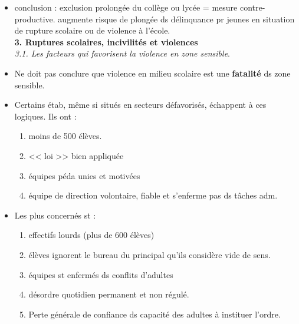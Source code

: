\documentclass[12pt]{report}
\begin{document}
\begin{itemize}
\vspace{0.5cm}

 \item conclusion : exclusion prolongée du collège ou lycée = mesure contre-productive. augmente risque de plongée ds délinquance pr jeunes en situation de rupture scolaire ou de violence à l'école.\\


\textbf{3. Ruptures scolaires, incivilités et violences} \\
\textit{3.1. Les facteurs qui favorisent la violence en zone sensible}.\\

\item Ne doit pas conclure que violence en milieu scolaire est une \textbf{fatalité} ds zone sensible.\\

\item Certains étab, même si situés en secteurs défavorisés, échappent à ces logiques. Ils ont : 
\begin{enumerate}
\item moins de 500 élèves.
\item << loi >> bien appliquée
\item équipes péda unies et motivées
\item équipe de direction volontaire, fiable et s'enferme pas ds tâches adm.
\end{enumerate}

\vspace{0.5cm}

\item  Les plus concernés st : 
\begin{enumerate}
\item effectifs lourds (plus de 600 élèves)
\item élèves ignorent le bureau du principal qu'ils considère vide de sens.
\item équipes st enfermés ds conflits d'adultes
\item désordre quotidien permanent et non  régulé.
\item Perte générale de confiance ds capacité des adultes à instituer l'ordre. \\
\end{enumerate}


\end{itemize}
\end{document}
